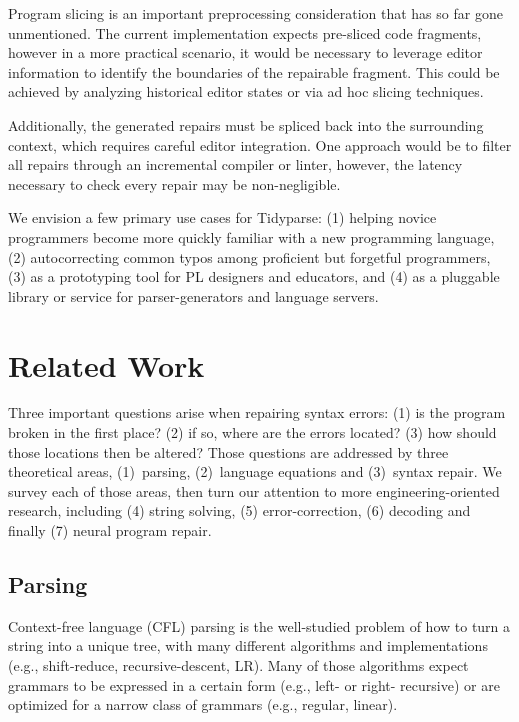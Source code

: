 \documentclass[runningheads]{llncs}
\begin{document}
  Program slicing is an important preprocessing consideration that has so far gone unmentioned. The current implementation expects pre-sliced code fragments, however in a more practical scenario, it would be necessary to leverage editor information to identify the boundaries of the repairable fragment. This could be achieved by analyzing historical editor states or via ad hoc slicing techniques.

  Additionally, the generated repairs must be spliced back into the surrounding context, which requires careful editor integration. One approach would be to filter all repairs through an incremental compiler or linter, however, the latency necessary to check every repair may be non-negligible.


  We envision a few primary use cases for Tidyparse: (1) helping novice programmers become more quickly familiar with a new programming language, (2) autocorrecting common typos among proficient but forgetful programmers, (3) as a prototyping tool for PL designers and educators, and (4) as a pluggable library or service for parser-generators and language servers.

  \section{Related Work}\label{sec:related}

  Three important questions arise when repairing syntax errors: (1) is the program broken in the first place? (2) if so, where are the errors located? (3) how should those locations then be altered? Those questions are addressed by three theoretical areas, (1)~parsing, (2)~language equations and (3)~syntax repair. We survey each of those areas, then turn our attention to more engineering-oriented research, including (4) string solving, (5) error-correction, (6) decoding and finally (7) neural program repair.

  \subsection{Parsing}

  Context-free language (CFL) parsing is the well-studied problem of how to turn a string into a unique tree, with many different algorithms and implementations (e.g., shift-reduce, recursive-descent, LR). Many of those algorithms expect grammars to be expressed in a certain form (e.g., left- or right- recursive) or are optimized for a narrow class of grammars (e.g., regular, linear).
\end{document}
